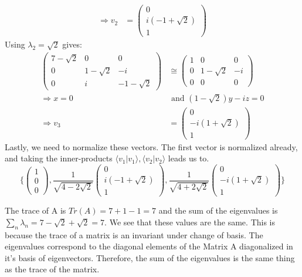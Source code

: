 \documentclass[a4paper, 11pt]{article}
\newcommand{\braket}[2]{\langle #1 | #2 \rangle}
\newenvironment{solution}{%
	\begin{list}{}{%
			\setlength{\topsep}{0pt}%
			\setlength{\leftmargin}{1.5cm}%
			\setlength{\rightmargin}{1.5cm}%
			\setlength{\listparindent}{\parindent}%
			\setlength{\itemindent}{\parindent}%
			\setlength{\parsep}{\parskip}%
	}%
	\item[]}{\end{list}}
\begin{document}
\begin{solution}
\begin{align*}
				\Rightarrow \mathit{v}_2 &= \begin{pmatrix}0 \\ i(-1+\sqrt{2}) \\ 1\end{pmatrix}
			\end{align*}
		Using $\lambda_2 = \sqrt{2}$ gives: 
			\begin{align*}
				\begin{pmatrix}7-\sqrt{2} & 0 & 0 \\ 0 & 1-\sqrt{2} & -i \\ 0 & i & -1-\sqrt{2}\end{pmatrix} &\cong \begin{pmatrix} 1 & 0 & 0 \\ 0 & 1-\sqrt{2} & -i \\ 0 & 0 & 0  \end{pmatrix} \\ 
				\Rightarrow x=0 &\text{ and } (1-\sqrt{2})y-iz = 0 \\ 
				\Rightarrow \mathit{v}_3 &= \begin{pmatrix}0 \\ -i(1+\sqrt{2}) \\ 1\end{pmatrix}
			\end{align*}
		Lastly, we need to normalize these vectors. The first vector is normalized already, and taking the inner-products $\braket{\mathit{v}_1}{\mathit{v}_1}, \braket{\mathit{v}_2}{\mathit{v}_2}$ leads us to.
			\begin{equation*}
				\Bigg\{ \begin{pmatrix} 1 \\ 0 \\ 0\end{pmatrix}, \frac{1}{\sqrt{4-2\sqrt{2}}}\begin{pmatrix}0 \\ i(-1+\sqrt{2}) \\ 1\end{pmatrix}, \frac{1}{\sqrt{4+2\sqrt{2}}}\begin{pmatrix}0 \\ -i(1+\sqrt{2}) \\ 1 \end{pmatrix}   \Bigg\}
			\end{equation*} 
		
		\noindent The trace of A is $Tr(A) = 7+1-1 = 7$ and the sum of the eigenvalues is $\sum_n\lambda_n = 7-\sqrt{2}+\sqrt{2} = 7$. We see that these values are the same. This is because the trace of a matrix is an invariant under change of basis. The eigenvalues correspond to the diagonal elements of the Matrix A diagonalized in it's basis of eigenvectors. Therefore, the sum of the eigenvalues is the same thing as the trace of the matrix. \\
	\end{solution}
\end{document}
